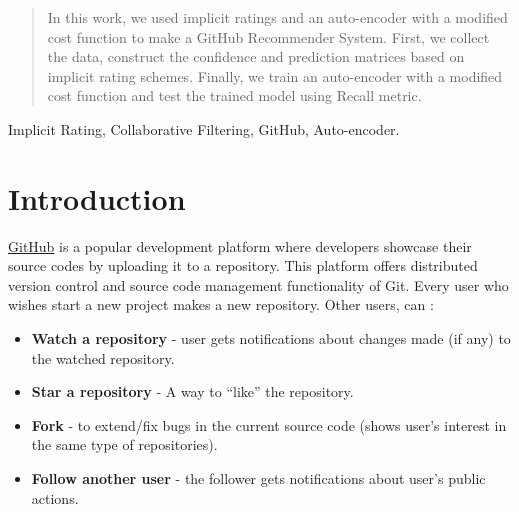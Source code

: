 \documentclass[conference]{IEEEtran}
\begin{document}
\maketitle


\begin{abstract}
In this work, we used implicit ratings and an auto-encoder with a modified cost function to make a GitHub Recommender System. First, we collect the data, construct the confidence and prediction matrices based on implicit rating schemes. Finally, we train an auto-encoder with a modified cost function and test the trained model using Recall metric.
\end{abstract}

\begin{IEEEkeywords}
Implicit Rating, Collaborative Filtering, GitHub, Auto-encoder.
\end{IEEEkeywords}






%
\IEEEpeerreviewmaketitle



\section{\textbf{Introduction}}
\href{https://github.com/}{GitHub} is a popular development platform where developers showcase their source codes by uploading it to a repository. This platform offers distributed version control and source code management functionality of Git. Every user who wishes start a new project makes a new repository. Other users, can :
\begin{itemize}
    \item{\textbf{Watch a repository} - user gets notifications about changes made (if any) to the watched repository.}
    \item{\textbf{Star a repository} - A way to ``like'' the repository}.
    \item{\textbf{Fork} - to extend/fix bugs in the current source code (shows user's interest in the same type of repositories).}
    \item{\textbf{Follow another user} - the follower gets notifications about user's public actions.}
\end{itemize}
\end{document}
